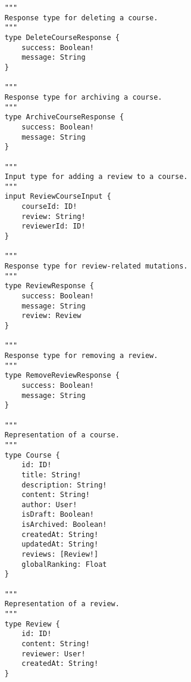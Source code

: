 \begin{verbatim}
	"""
	Response type for deleting a course.
	"""
	type DeleteCourseResponse {
		success: Boolean!
		message: String
	}
	
	"""
	Response type for archiving a course.
	"""
	type ArchiveCourseResponse {
		success: Boolean!
		message: String
	}
	
	"""
	Input type for adding a review to a course.
	"""
	input ReviewCourseInput {
		courseId: ID!
		review: String!
		reviewerId: ID!
	}
	
	"""
	Response type for review-related mutations.
	"""
	type ReviewResponse {
		success: Boolean!
		message: String
		review: Review
	}
	
	"""
	Response type for removing a review.
	"""
	type RemoveReviewResponse {
		success: Boolean!
		message: String
	}
	
	"""
	Representation of a course.
	"""
	type Course {
		id: ID!
		title: String!
		description: String!
		content: String!
		author: User!
		isDraft: Boolean!
		isArchived: Boolean!
		createdAt: String!
		updatedAt: String!
		reviews: [Review!]
		globalRanking: Float
	}
	
	"""
	Representation of a review.
	"""
	type Review {
		id: ID!
		content: String!
		reviewer: User!
		createdAt: String!
	}
	
\end{verbatim}

